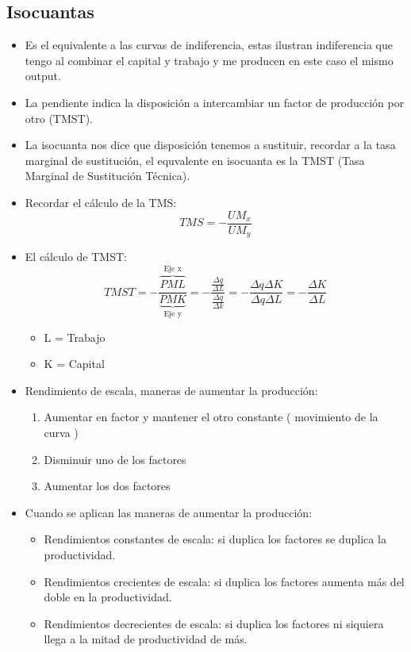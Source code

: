 \subsection{Isocuantas}
\begin{itemize}
    \item Es el equivalente a las curvas de indiferencia, estas ilustran indiferencia que tengo al combinar el capital y trabajo y me producen en este caso el mismo output.
    \item La pendiente indica la disposición a intercambiar un factor de producción por otro (TMST).
    \item La isocuanta nos dice que disposición tenemos a sustituir, recordar a la tasa marginal de sustitución, el equvalente en isocuanta es la TMST (Tasa Marginal de Sustitución Técnica).
    \item Recordar el cálculo de la TMS:
        \[
          TMS = -\frac{UM_x}{UM_y} 
        \]
    
    \item El cálculo de TMST:
        \[
          TMST = -\frac{\overbrace{PML}^{\text{  Eje x  }}}{\underbrace{PMK}_{\text{  Eje y  }}} =  
          -\frac{\frac{\Delta q}{\Delta L}}{\frac{\Delta q}{\Delta k} } 
          = -\frac{\Delta q \Delta K }{\Delta q \Delta L} 
          = -\frac{\Delta K}{\Delta L} 
        \]
        \begin{itemize}[label=\#]
            \item L = Trabajo 
            \item K = Capital 
        \end{itemize}
    
    \item Rendimiento de escala, maneras de aumentar la producción:
        \begin{enumerate}
            \item Aumentar en factor y mantener el otro constante ( movimiento de la curva ) 
            \item Disminuir uno de los factores 
            \item Aumentar los dos factores
        \end{enumerate}
    
    \item Cuando se aplican las maneras de aumentar la producción:
        \begin{itemize}
            \item Rendimientos constantes de escala: si duplica los factores se duplica la productividad. 
            \item Rendimientos crecientes de escala: si duplica los factores aumenta más del doble en la productividad.
            \item Rendimientos decrecientes de escala: si duplica los factores ni siquiera llega a la mitad de productividad de más.
        \end{itemize}
\end{itemize}


